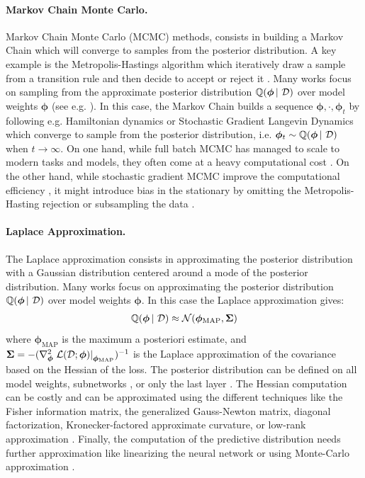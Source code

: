 \paragraph*{Markov Chain Monte Carlo.} Markov Chain Monte Carlo (MCMC) methods, consists in building a Markov Chain which will converge to samples from the posterior distribution. A key example is the Metropolis-Hastings algorithm which iteratively draw a sample from a transition rule and then decide to accept or reject it \cite{robert2015metropolis}. Many works focus on sampling from the approximate posterior distribution $\operatorname{\mathbb{Q}}(\bm{\phi} \,|\, \operatorname{\mathcal{D}})$ over model weights $\bm{\phi}$ (see e.g. \citep{duane1987hybrid,welling2011langevin}). In this case, the Markov Chain builds a sequence $\bm{\phi},\cdot,\bm{\phi}_t$ by following e.g. Hamiltonian dynamics \citep{duane1987hybrid} or Stochastic Gradient Langevin Dynamics \cite{welling2011langevin,garriga-alonso2021exact,ma2015mcmc} which converge to sample from the posterior distribution, i.e. $\bm{\phi}_t \sim \operatorname{\mathbb{Q}}(\bm{\phi} \,|\, \operatorname{\mathcal{D}})$ when $t \rightarrow \infty$. On one hand, while full batch MCMC has managed to scale to modern tasks and models, they often come at a heavy computational cost \citep{what-bnn-posterior}. On the other hand, while stochastic gradient MCMC improve the computational efficiency \cite{welling2011langevin,garriga-alonso2021exact,ma2015mcmc}, it might introduce bias in the stationary by omitting the Metropolis-Hasting rejection or subsampling the data \citep{betancourt2015data,what-bnn-posterior}.

\paragraph*{Laplace Approximation.} The Laplace approximation consists in approximating the posterior distribution with a Gaussian distribution centered around a mode of the posterior distribution. Many works focus on approximating the posterior distribution $\operatorname{\mathbb{Q}}(\bm{\phi} \,|\, \operatorname{\mathcal{D}})$ over model weights $\bm{\phi}$. In this case the Laplace approximation gives:
\begin{align*}
    \operatorname{\mathbb{Q}}(\bm{\phi} \,|\, \operatorname{\mathcal{D}}) \approx \operatorname{\mathcal{N}}(\bm{\phi}_\text{MAP}, \bm{\Sigma})
\end{align*}
where $\bm{\phi}_\text{MAP}$ is the maximum a posteriori estimate, and $\bm{\Sigma}=-(\nabla_{\bm{\phi}}^2 \left.\operatorname{\mathcal{L}}(\operatorname{\mathcal{D}};\bm{\phi})\right|_{\bm{\phi}_\text{MAP}})^{-1}$ is the Laplace approximation of the covariance based on the Hessian of the loss. The posterior distribution can be defined on all model weights, subnetworks \cite{daxberger2021bayesian}, or only the last layer \cite{bayesian-a-bit}. The Hessian computation can be costly and can be approximated using the different techniques like the Fisher information matrix, the generalized Gauss-Newton matrix, diagonal factorization, Kronecker-factored approximate curvature, or low-rank approximation \citep{daxberger2021laplace}. Finally, the computation of the predictive distribution needs further approximation like linearizing the neural network or using Monte-Carlo approximation \citep{daxberger2021laplace}.

